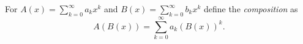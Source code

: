 

\setcounter{section}{2}
\setcounter{subsection}{2}
\setcounter{dfn}{5}

\begin{dfn}
For $A(x) = \sum_{k=0}^\infty a_k x^k$ and $B(x) = \sum_{k=0}^\infty b_k x^k$ define the \emph{composition} as
\[
A(B(x)) = \sum_{k=0}^\infty a_k (B(x))^k.
\]
\end{dfn}


